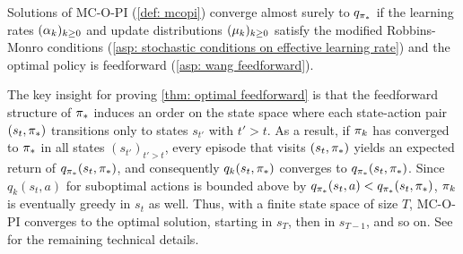 
\vspace{-0.2cm}



\vspace{-0.3cm}

\begin{theorem}
\label{thm: optimal feedforward}
Solutions of MC-O-PI (\autoref{def: mcopi}) converge almost surely to $q_{{\pi}_*}$
if 
the learning rates $(\alpha_k)_{k \geq 0}$ and update distributions $(\mu_k)_{k \geq 0}$ satisfy the modified Robbins-Monro conditions (\autoref{asp: stochastic conditions on effective learning rate})
and the optimal policy is feedforward (\autoref{asp: wang feedforward}).
\end{theorem}

\vspace{-0.5cm}

The key insight for proving \autoref{thm: optimal feedforward} is that the feedforward structure of ${\pi}_*$ induces an order on the state space where each state-action pair $(s_t, {\pi}_*)$ transitions only to states $s_{t'}$ with $t' > t$.
As a result, if $\pi_k$ has converged to ${\pi}_*$ in all states $(s_{t'})_{t' > t}$, every episode that visits $(s_t, {\pi}_*)$ yields an expected return of $q_{{\pi}_*}(s_t, {\pi}_*)$,
and consequently $q_k(s_t, {\pi}_*)$ converges to $q_{{\pi}_*}(s_t, {\pi}_*)$.
Since $q_k(s_t, a)$ for suboptimal actions is bounded above by $q_{{\pi}_*}(s_t, a) < q_{{\pi}_*}(s_t, {\pi}_*)$, $\pi_k$ is eventually greedy in $s_t$ as well.
Thus, with a finite state space of size $T$, MC-O-PI converges to the optimal solution, starting in $s_T$, then in $s_{T-1}$, and so on.
See \cite[Appendix~B]{Wang2022OnLearning} for the remaining technical details.

% 


